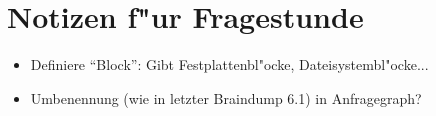 \section{Notizen f"ur Fragestunde}
\begin{itemize}
	\item
		Definiere \enquote{Block}: Gibt Festplattenbl"ocke, Dateisystembl"ocke...
	\item
		Umbenennung (wie in letzter Braindump 6.1) in Anfragegraph?
\end{itemize}
